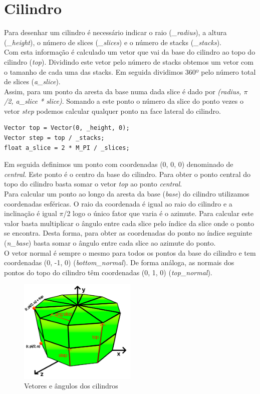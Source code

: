 \documentclass[a4paper]{report}
\begin{document}
\section{Cilindro}
Para desenhar um cilindro é necessário indicar o raio (\textit{\_radius}), a
altura (\textit{\_height}), o número de slices (\textit{\_slices}) e o número de
stacks (\textit{\_stacks}).\\
Com esta informação é calculado um vetor que vai da base do cilindro ao topo do
cilindro (\textit{top}). Dividindo este vetor pelo número de stacks obtemos um
vetor com o tamanho de cada uma das stacks. Em seguida dividimos 360º pelo
número total de slices (\textit{a\_slice}).\\
Assim, para um ponto da aresta da base numa dada slice é dado por
\textit{(radius, $\pi$/2, a\_slice * slice)}. Somando a este ponto o número da
slice do ponto vezes o vetor \textit{step} podemos calcular qualquer ponto na
face lateral do cilindro.
\begin{lstlisting}
Vector top = Vector(0, _height, 0);
Vector step = top / _stacks;
float a_slice = 2 * M_PI / _slices;
\end{lstlisting}
Em seguida definimos um ponto com coordenadas (0, 0, 0) denominado de
\textit{central}. Este ponto é o centro da base do cilindro. Para obter o
ponto central do topo do cilindro basta somar o vetor \textit{top} ao ponto
\textit{central}.\\
Para calcular um ponto ao longo da aresta da base (\textit{base}) do cilindro
utilizamos coordenadas esféricas. O raio da coordenada é igual ao raio do
cilindro e a inclinação é igual $\pi$/2 logo o único fator que varia é o
azimute. Para calcular este valor basta multiplicar o ângulo entre cada slice
pelo índice da slice onde o ponto se encontra. Desta forma, para obter as
coordenadas do ponto no índice seguinte (\textit{n\_base}) basta somar o ângulo
entre cada slice ao azimute do ponto.\\
O vetor normal é sempre o mesmo para todos os pontos da base do
cilindro e tem coordenadas (0, -1, 0) (\textit{bottom\_normal}). De forma
análoga, as normais dos pontos do topo do cilindro têm coordenadas (0, 1, 0)
(\textit{top\_normal}).\\
\begin{figure}[H]
    \centering 
    \includegraphics[width=0.5\textwidth]{images/cilindro_vetores.png}  
    \caption{Vetores e ângulos dos cilindros}
\end{figure}
\end{document}
